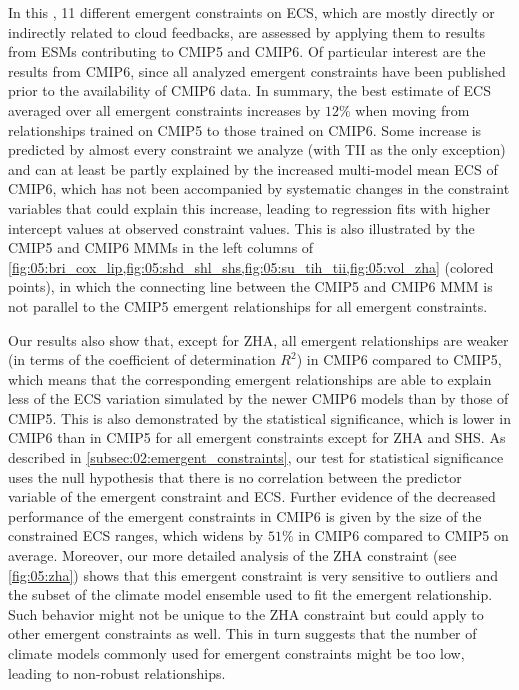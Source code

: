 In this , 11 different emergent constraints on
\ac{ECS}, which are mostly directly or indirectly related to cloud feedbacks,
are assessed by applying them to results from \acp{ESM} contributing to
\acs{CMIP}5 and \acs{CMIP}6. Of particular interest are the results from
\acs{CMIP}6, since all analyzed emergent constraints have been published prior
to the availability of \acs{CMIP}6 data. In summary, the best estimate of
\ac{ECS} averaged over all emergent constraints increases by $12 \unit{\%}$
when moving from relationships trained on \acs{CMIP}5 to those trained on
\acs{CMIP}6. Some increase is predicted by almost every constraint we analyze
(with TII as the only exception) and can at least be partly explained by the
increased multi-model mean \ac{ECS} of \acs{CMIP}6, which has not been
accompanied by systematic changes in the constraint variables that could
explain this increase, leading to regression fits with higher intercept values
at observed constraint values. This is also illustrated by the \acs{CMIP}5 and
\acs{CMIP}6 \acp{MMM} in the left columns of
\cref{fig:05:bri_cox_lip,fig:05:shd_shl_shs,fig:05:su_tih_tii,fig:05:vol_zha}
(colored points), in which the connecting line between the \acs{CMIP}5 and
\acs{CMIP}6 \ac{MMM} is not parallel to the \acs{CMIP}5 emergent relationships
for all emergent constraints.

Our results also show that, except for ZHA, all emergent relationships are
weaker (in terms of the coefficient of determination $R^2$) in \acs{CMIP}6
compared to \acs{CMIP}5, which means that the corresponding emergent
relationships are able to explain less of the \ac{ECS} variation simulated by
the newer \acs{CMIP}6 models than by those of \acs{CMIP}5. This is also
demonstrated by the statistical significance, which is lower in \acs{CMIP}6
than in \acs{CMIP}5 for all emergent constraints except for ZHA and SHS. As
described in \cref{subsec:02:emergent_constraints}, our test for statistical
significance uses the null hypothesis that there is no correlation between the
predictor variable of the emergent constraint and \ac{ECS}. Further evidence of
the decreased performance of the emergent constraints in \acs{CMIP}6 is given
by the size of the constrained \acs{ECS} ranges, which widens by $51 \unit{\%}$
in \acs{CMIP}6 compared to \acs{CMIP}5 on average. Moreover, our more detailed
analysis of the ZHA constraint (see \cref{fig:05:zha}) shows that this emergent
constraint is very sensitive to outliers and the subset of the climate model
ensemble used to fit the emergent relationship. Such behavior might not be
unique to the ZHA constraint but could apply to other emergent constraints as
well. This in turn suggests that the number of climate models commonly used for
emergent constraints might be too low, leading to non-robust relationships.

